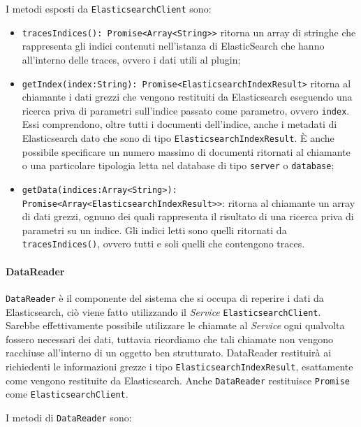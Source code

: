 I metodi esposti da \texttt{ElasticsearchClient} sono: 
\begin{itemize} 
	\item \texttt{tracesIndices(): Promise<Array<String>>} ritorna un array di stringhe che rappresenta gli indici contenuti nell'istanza di ElasticSearch che hanno all'interno delle traces, ovvero i dati utili al plugin; 
	\item \texttt{getIndex(index:String): Promise<ElasticsearchIndexResult>} ritorna al chiamante i dati grezzi che vengono restituiti da Elasticsearch eseguendo una ricerca priva di parametri sull'indice passato come parametro, ovvero \texttt{index}. Essi comprendono, oltre tutti i documenti dell'indice, anche i metadati di Elasticsearch dato che sono di tipo \texttt{ElasticsearchIndexResult}. È anche possibile specificare un numero massimo di documenti ritornati al chiamante o una particolare tipologia letta nel database di tipo \texttt{server} o \texttt{database}; 
	\item \texttt{getData(indices:Array<String>): Promise<Array<ElasticsearchIndexResult>>}: ritorna al chiamante un array di dati grezzi, ognuno dei quali rappresenta il risultato di una ricerca priva di parametri su un indice. Gli indici letti sono quelli ritornati da \texttt{tracesIndices()}, ovvero tutti e soli quelli che contengono traces. 
\end{itemize} 

\paragraph{DataReader} \Spazio
\label{sec:DataReader}
\texttt{DataReader} è il componente del sistema che si occupa di reperire i dati da Elasticsearch, ciò viene fatto utilizzando il \emph{Service} \texttt{ElasticsearchClient}. Sarebbe effettivamente possibile utilizzare le chiamate al \emph{Service} ogni qualvolta fossero necessari dei dati, tuttavia ricordiamo che tali chiamate non vengono racchiuse all'interno di un oggetto ben strutturato. DataReader restituirà ai richiedenti le informazioni grezze i tipo \texttt{ElasticsearchIndexResult}, esattamente come vengono restituite da Elasticsearch. Anche \texttt{DataReader} restituisce \texttt{Promise} come \texttt{ElasticsearchClient}.

I metodi di \texttt{DataReader} sono:  

